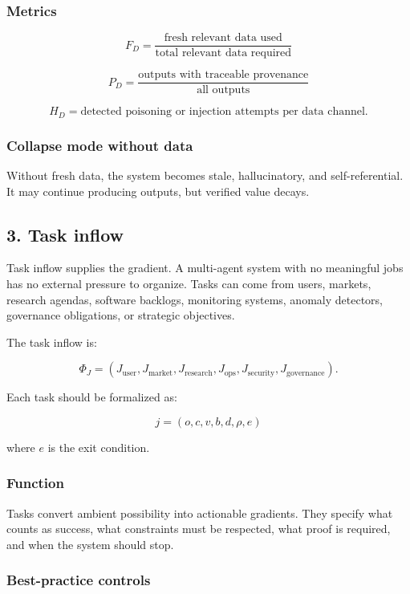 \subsubsection{Metrics}\label{metrics-1}

\[
F_D=\frac{\text{fresh relevant data used}}{\text{total relevant data required}}
\]

\[
P_D=\frac{\text{outputs with traceable provenance}}{\text{all outputs}}
\]

\[
H_D=\text{detected poisoning or injection attempts per data channel}.
\]

\subsubsection{Collapse mode without
data}\label{collapse-mode-without-data}

Without fresh data, the system becomes stale, hallucinatory, and
self-referential. It may continue producing outputs, but verified value
decays.

\subsection{3. Task inflow}\label{task-inflow}

Task inflow supplies the gradient. A multi-agent system with no
meaningful jobs has no external pressure to organize. Tasks can come
from users, markets, research agendas, software backlogs, monitoring
systems, anomaly detectors, governance obligations, or strategic
objectives.

The task inflow is:

\[
\Phi_J=(J_{\text{user}},J_{\text{market}},J_{\text{research}},J_{\text{ops}},J_{\text{security}},J_{\text{governance}}).
\]

Each task should be formalized as:

\[
j=(o,c,v,b,d,\rho,e)
\]

where \(e\) is the exit condition.

\subsubsection{Function}\label{function-2}

Tasks convert ambient possibility into actionable gradients. They
specify what counts as success, what constraints must be respected, what
proof is required, and when the system should stop.

\subsubsection{Best-practice controls}\label{best-practice-controls-2}

